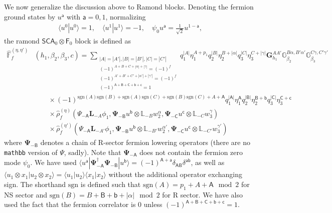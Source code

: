\documentclass[12pt]{article}
\newcommand{\ie}{\begin{equation}\begin{aligned}}
\newcommand{\fe}{\end{aligned}\end{equation}}
\numberwithin{equation}{section}
\begin{document}
We now generalize the discussion above to Ramond blocks. Denoting the fermion ground states by $u^\mathsf{a}$ with $\mathsf{a}=0,1$, normalizing
\ie
\langle u^0|u^0\rangle = 1,\quad \langle u^1|u^1 \rangle=-1,\quad \psi_0 u^\mathsf{a}=\frac{1}{\sqrt{2}}u^{1-\mathsf{a}},
\fe
the ramond $\mathsf{SCA}_0\otimes \mathsf{F}_0$ block is defined as
\ie 
\widehat{\mathbb{F}}_f^{(\eta, \eta')}&(h_1, \beta_2, \beta_3, c) = \sum_{
\substack{|A|=|A'|, |B|=|B'|, |C|=|C'|\\
(-1)^{A+B+C+|\alpha|+|\gamma|}=(-1)^f\\
(-1)^{A'+B'+C'+|\alpha'|+|\gamma'|}=(-1)^f\\
(-1)^{\mathsf{A+B+C+b+c}}=1}
} q_1^{|A|} \eta_1^{A+p_1} q_2^{|B|} \eta_2^{B+|\alpha|} q_3^{|C|} \eta_3^{C+|\gamma|} \mathbf{G}^{AA'}_{h_1} \mathbb{G}^{B\alpha, B'\alpha'}_{\beta_2} \mathbb{G}^{C\gamma, C'\gamma'}_{\beta_3}\\
&\quad\quad \times (-1)^{\text{sgn}(A)\text{sgn}(B)+\text{sgn}(A)\text{sgn}(C)+\text{sgn}(B)\text{sgn}(C)+A+\mathsf{A}} q_1^{|\mathsf{A}|} \eta_1^{\mathsf{A}} q_2^{|\mathsf{B}|} \eta_2^{\mathsf{B}+\mathsf{b}} q_3^{|\mathsf{C}|} \eta_3^{\mathsf{C}+\mathsf{c}}\\
&\quad\quad \times \hat{\rho}_f^{(\eta)}(\Psi_{-\mathsf{A}}\mathbf{L}_{-A}\phi_1, \boldsymbol\Psi_{-\mathsf{B}}u^{\mathsf{b}}\otimes \mathbb{L}_{-B}w^\alpha_2, \boldsymbol\Psi_{-\mathsf{C}}u^{\mathsf{c}}\otimes \mathbb{L}_{-C}w^\gamma_3)\\
&\quad\quad \times \hat{\rho}_f^{(\eta')}(\Psi_{-\mathsf{A}}\mathbf{L}_{-A'}\phi_1, \boldsymbol\Psi_{-\mathsf{B}}u^{\mathsf{b}}\otimes \mathbb{L}_{-B'}w^{\alpha'}_2, \boldsymbol\Psi_{-\mathsf{C}}u^{\mathsf{c}} \otimes\mathbb{L}_{-C'}w^{\gamma'}_3)
\fe
where $\boldsymbol{\Psi}_{-\mathsf{B}}$ denotes a chain of R-sector fermion lowering operators (there are no \texttt{mathbb} version of $\Psi$, sadly). Note that $\boldsymbol\Psi_{-\mathsf{A}}$ does not contain the fermion zero mode $\psi_0$. We have used $\langle u^\mathsf{a}|\boldsymbol\Psi_{-\mathsf{A}}^\dagger \boldsymbol\Psi_{-\mathsf{B}}|u^{\mathsf{b}}\rangle=(-1)^{\mathsf{A}+\mathsf{a}}\delta_{\mathsf{AB}}\delta^{\mathsf{a}\mathsf{b}}$, as well as $\langle u_1\otimes x_1| u_2\otimes x_2 \rangle=\langle u_1|u_2\rangle \langle x_1|x_2\rangle$ without the additional operator exchanging sign. The shorthand $\text{sgn}$ is defined such that ${\text{sgn}(A)}=p_1+A+\mathsf{A} \mod 2$ for NS sector and ${\text{sgn}(B)}=B+\mathsf{B}+\mathsf{b}+|\alpha| \mod 2$ for R sector. We have also used the fact that the fermion correlator is 0 unless $(-1)^{\mathsf{A+B+C+b+c}}=1$.
\end{document}
